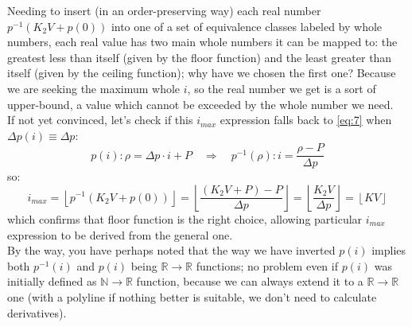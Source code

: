 \documentclass[10pt,a4paper]{article}
\begin{document}
	Needing to insert (in an order-preserving way) each real number $p^{-1}(K_{2}V + p(0))$ into one of a set of equivalence classes labeled by whole numbers, each real value has two main whole numbers it can be mapped to: the greatest less than itself (given by the floor function) and the least greater than itself (given by the ceiling function); why have we chosen the first one? Because we are seeking the maximum whole $i$, so the real number we get is a sort of upper-bound, a value which cannot be exceeded by the whole number we need.\\
	If not yet convinced, let’s check if this $i_{max}$ expression falls back to \ref{eq:7} when ${\Delta p(i) \equiv \Delta p}$:
	\begin{equation*}
		p(i): \rho = \Delta p \cdot i + P \quad \Longrightarrow \quad p^{-1}(\rho): i = \frac{\rho - P}{\Delta p}
 	\end{equation*}
 	so:
 	\begin{equation*}
 		i_{max}=\left\lfloor p^{-1}(K_{2}V+p(0)) \right\rfloor = \left\lfloor \frac{(K_{2}V+P)-P}{\Delta p} \right\rfloor = \left\lfloor \frac{K_{2}V}{\Delta p} \right\rfloor = \left\lfloor KV \right\rfloor
	\end{equation*}
	which confirms that floor function is the right choice, allowing particular $i_{max}$ expression to be derived from the general one.\\
	By the way, you have perhaps noted that the way we have inverted $p(i)$ implies both $p^{-1}(i)$ and $p(i)$ being $\mathbb{R} \rightarrow \mathbb{R}$ functions; no problem even if $p(i)$ was initially defined as $\mathbb{N} \rightarrow \mathbb{R}$ function, because we can always extend it to a $\mathbb{R} \rightarrow \mathbb{R}$ one (with a polyline if nothing better is suitable, we don’t need to calculate derivatives).
	
\end{document}
